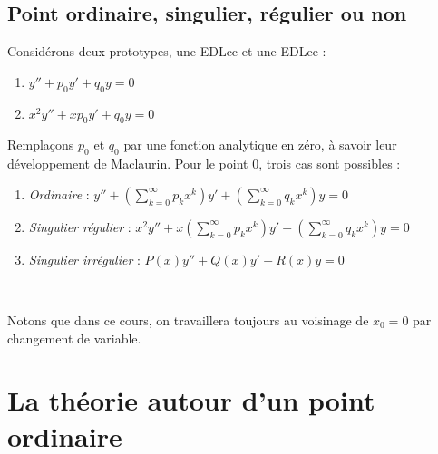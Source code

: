 	\subsection{Point ordinaire, singulier, régulier ou non}
	Considérons deux prototypes, une EDLcc et une EDLee :
	\begin{enumerate}
	\item $y''+p_0y'+q_0y = 0$
	\item $x^2y''+xp_0y'+q_0y = 0$
	\end{enumerate}
	Remplaçons $p_0$ et $q_0$ par une fonction analytique en zéro, à savoir leur 
	développement de Maclaurin. Pour le point 0, trois cas sont possibles :
	\begin{enumerate}
	\item \textit{Ordinaire} : $y'' +\left(\sum_{k=0}^\infty p_kx^k\right)y' +
	\left(\sum_{k=0}^\infty q_kx^k\right)y = 0$
	\item \textit{Singulier régulier} : $x^2y'' + x\left(\sum_{k=0}^\infty p_kx^k
	\right)y'+\left(\sum_{k=0}^\infty q_kx^k\right)y=0$
	\item \textit{Singulier irrégulier} : $P(x)y'' + Q(x)y' + R(x)y = 0$
	\end{enumerate}
	\ 
		
	Notons que dans ce cours, on travaillera toujours au voisinage de $x_0=0$ par 
	changement de variable.
	
	
\setcounter{section}{2}
\section{La théorie autour d'un point ordinaire}
	\setcounter{subsection}{1}
